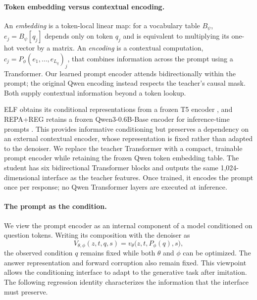 \paragraph{Token embedding versus contextual encoding.}
An \emph{embedding} is a token-local linear map: for a vocabulary table $B_\psi$, $e_j=B_\psi[q_j]$ depends only on token $q_j$ and is equivalent to multiplying its one-hot vector by a matrix. An \emph{encoding} is a contextual computation, $c_j=P_\phi(e_1,\ldots,e_{L_q})_j$, that combines information across the prompt using a Transformer. Our learned prompt encoder attends bidirectionally within the prompt; the original Qwen encoding instead respects the teacher's causal mask. Both supply contextual information beyond a token lookup.

ELF obtains its conditional representations from a frozen T5 encoder \citep{elf}, and REPA+REG retains a frozen Qwen3-0.6B-Base encoder for inference-time prompts \citep{scalingdlm}. This provides informative conditioning but preserves a dependency on an external contextual encoder, whose representation is fixed rather than adapted to the denoiser. We replace the teacher Transformer with a compact, trainable prompt encoder while retaining the frozen Qwen token embedding table. The student has six bidirectional Transformer blocks and outputs the same 1,024-dimensional interface as the teacher features. Once trained, it encodes the prompt once per response; no Qwen Transformer layers are executed at inference.

\paragraph{The prompt as the condition.}
We view the prompt encoder as an internal component of a model conditioned on question tokens. Writing its composition with the denoiser as
\begin{equation}
 V_{\theta,\phi}(z,t,q,s)=v_\theta\bigl(z,t,P_\phi(q),s\bigr),
 \label{eq:tokenconditionalfield}
\end{equation}
the observed condition $q$ remains fixed while both $\theta$ and $\phi$ can be optimized. The answer representation and forward corruption also remain fixed. This viewpoint allows the conditioning interface to adapt to the generative task after imitation. The following regression identity characterizes the information that the interface must preserve.


